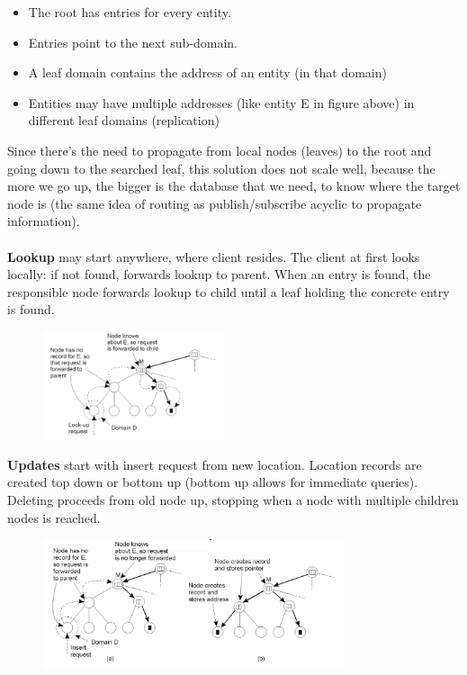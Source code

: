 \documentclass[10pt,a4paper]{article}
\begin{document}
\begin{itemize}
	\item The root has entries for every entity.
	\item Entries point to the next sub-domain. 
	\item A leaf domain contains the address of an entity (in that domain)
	\item Entities may have multiple addresses (like entity E in figure above) in different leaf domains (replication)
\end{itemize}
Since there's the need to propagate from local nodes (leaves) to the root and going down to the searched leaf, this solution does not scale well, because the more we go up, the bigger is the database that we need, to know where the target node is (the same idea of routing as publish/subscribe acyclic to propagate information). \\ \\
\textbf{Lookup} may start anywhere, where client resides. The client at first looks locally: if not found, forwards lookup to parent. When an entry is found, the responsible node forwards lookup to child until a leaf holding the concrete entry is found.
\begin{figure}[h!]
 \hfill \includegraphics[width=150pt]{images/hierarchical-lookup.png}\hspace*{\fill}
  \label{fig:hierarchical-lookup}
\end{figure}
\textbf{Updates} start with insert request from new location. Location records are created top down or bottom up (bottom up allows for immediate queries). Deleting proceeds from old node up, stopping when a node with multiple children nodes is reached.
\begin{figure}[h!]
 \hfill \includegraphics[width=250pt]{images/hierarchical-updates.png}\hspace*{\fill}
  \label{fig:hierarchical-updates}
\end{figure}
\end{document}
